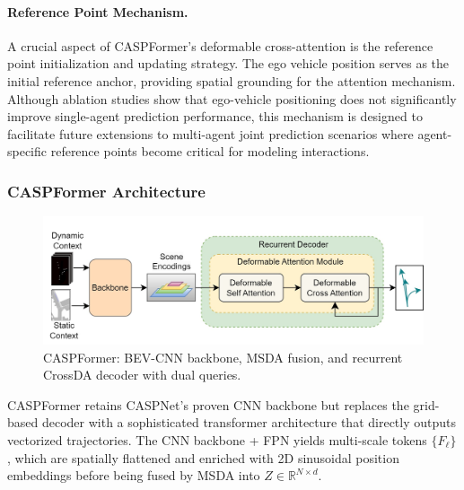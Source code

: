 \paragraph{Reference Point Mechanism.} A crucial aspect of CASPFormer's deformable cross-attention is the reference point initialization and updating strategy. The ego vehicle position serves as the initial reference anchor, providing spatial grounding for the attention mechanism. Although ablation studies show that ego-vehicle positioning does not significantly improve single-agent prediction performance, this mechanism is designed to facilitate future extensions to multi-agent joint prediction scenarios where agent-specific reference points become critical for modeling interactions.

\subsubsection{CASPFormer Architecture}
\begin{figure}[ht]
  \centering
  \includegraphics[width=\linewidth]{figures/caspformer-overall-arch.jpg}
  \caption{CASPFormer: BEV-CNN backbone, MSDA fusion, and recurrent CrossDA decoder with dual queries.}
  \label{fig:caspformer_overall}
\end{figure}

CASPFormer retains CASPNet's proven CNN backbone but replaces the grid-based decoder with a sophisticated transformer architecture that directly outputs vectorized trajectories. The CNN backbone + FPN yields multi-scale tokens $\{F_\ell\}$, which are spatially flattened and enriched with 2D sinusoidal position embeddings before being fused by MSDA into $Z\in\mathbb R^{N\times d}$.

